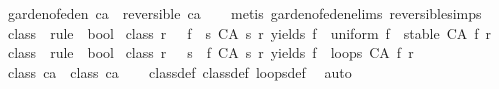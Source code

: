 \begin{isabellebody}
\isanewline
{}\isamarkupfalse%
\ {\isachardoublequoteopen}garden{\isacharunderscore}of{\isacharunderscore}eden\ ca\ {\isasymLongrightarrow}\ {\isasymnot}reversible\ ca{\isachardoublequoteclose}\isanewline
%
\isadelimproof
\ \ %
\endisadelimproof
%
\isatagproof
{}\isamarkupfalse%
\ {\isacharparenleft}metis\ garden{\isacharunderscore}of{\isacharunderscore}eden{\isachardot}elims{\isacharparenleft}{}{\isacharparenright}\ reversible{\isachardot}simps{\isacharparenright}%
\endisatagproof
{\isafoldproof}%
%
\isadelimproof
\isanewline
%
\endisadelimproof
\isanewline
\isanewline
{}\isamarkupfalse%
\ class{}\ {\isacharcolon}{\isacharcolon}\ {\isachardoublequoteopen}rule\ {\isasymRightarrow}\ bool{\isachardoublequoteclose}\ \isanewline
{\isachardoublequoteopen}class{}\ r\ {\isasymequiv}\ {\isacharparenleft}{\isasymexists}{\isacharbang}\ f{\isachardot}\ {\isacharparenleft}{\isasymforall}\ s{\isachardot}\ {\isacharparenleft}CA\ s\ r{\isacharparenright}\ yields\ f\ {\isasymand}\ uniform\ f\ {\isasymand}\ stable\ {\isacharparenleft}CA\ f\ r{\isacharparenright}{\isacharparenright}{\isacharparenright}{\isachardoublequoteclose}\isanewline
\isanewline
{}\isamarkupfalse%
\ class{}\ {\isacharcolon}{\isacharcolon}\ {\isachardoublequoteopen}rule\ {\isasymRightarrow}\ bool{\isachardoublequoteclose}\ \isanewline
{\isachardoublequoteopen}class{}\ r\ {\isasymequiv}\ {\isacharparenleft}{\isasymforall}\ s{\isachardot}\ {\isacharparenleft}{\isasymexists}\ f{\isachardot}\ {\isacharparenleft}CA\ s\ r{\isacharparenright}\ yields\ f\ {\isasymand}\ loops\ {\isacharparenleft}CA\ f\ r{\isacharparenright}{\isacharparenright}{\isacharparenright}{\isachardoublequoteclose}\isanewline
\isanewline
{}\isamarkupfalse%
\ {\isachardoublequoteopen}class{}\ ca\ {\isasymLongrightarrow}\ class{}\ ca{\isachardoublequoteclose}\isanewline
%
\isadelimproof
\ \ %
\endisadelimproof
%
\isatagproof
{}\isamarkupfalse%
\ class{}{\isacharunderscore}def\ class{}{\isacharunderscore}def\ loops{\isacharunderscore}def\ \isamarkupfalse%
\ auto%
\endisatagproof
{\isafoldproof}%
%
\isadelimproof
\isanewline
%
\endisadelimproof
%
\isadelimtheory
%
\endisadelimtheory
%
\isatagtheory
{}\isamarkupfalse%
%
\endisatagtheory
{\isafoldtheory}%
%
\isadelimtheory
%
\endisadelimtheory
%
\end{isabellebody}%
\endinput

